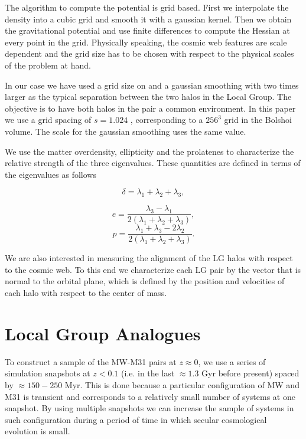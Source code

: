 \documentclass{emulateapj}
\newcommand{\hMpc}{{\ifmmode{h^{-1}{\rm Mpc}}\else{$h^{-1}$Mpc }\fi}}
\begin{document}
The algorithm to compute the potential is grid based. First we
interpolate the density into a cubic grid and smooth it with a
gaussian kernel. Then we obtain the gravitational potential and use
finite differences to compute the Hessian at every point in the
grid. Physically speaking, the cosmic web features are scale
dependent and the grid size has to be chosen with respect to the
physical scales of the problem at hand.

In our case we have used a grid size on and a gaussian smoothing with
two times larger as the typical separation between the two
halos in the Local Group. The objective is to have both halos in the
pair a common environment. In this paper we use a grid spacing of
$s=1.024$ \hMpc, corresponding to a $256^3$ grid in the Bolshoi
volume. The scale for the gaussian smoothing uses the same value.


We use the matter overdensity, ellipticity and the prolatenes to characterize
the relative strength of the three eigenvalues. These quantities are
defined in terms of the eigenvalues as follows

\begin{equation}
\delta = \lambda_1 + \lambda_2 + \lambda_3,
\end{equation}

\begin{equation}
e= \frac{\lambda_3 - \lambda_1}{2(\lambda_1 + \lambda_2 + \lambda_3)}, 
\end{equation}
%
\begin{equation}
p= \frac{\lambda_1 + \lambda_3 - 2\lambda_2}{2(\lambda_1 + \lambda_2 +
  \lambda_3)}.
\end{equation}

We are also interested in measuring the alignment of the LG halos with
respect to the cosmic web. To this end we characterize each LG pair by
the vector that is normal to the orbital plane, which is defined by
the position and velocities of each halo with respect to the center of
mass. 


\section{Local Group Analogues}
\label{sec:lg_analogues}

To construct a sample of the MW-M31 pairs at $z\approx 0$, we use a
series of simulation snapshots  at $z<0.1$ (i.e. in the last $\approx
1.3$ Gyr before present) spaced by $\approx 150-250$ Myr. This is done
because a particular configuration of MW and M31 is transient and
corresponds to a relatively small number of systems at one
snapshot. By using multiple snapshots we can increase the sample of
systems in such configuration during a period of time in which secular
cosmological evolution is small. 
\end{document}
